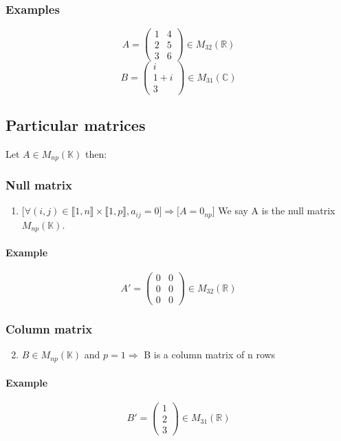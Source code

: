 \documentclass[notitlepage]{math}
\begin{document}
\subsubsection{Examples}

\[ A = \begin{pmatrix}
    1 & 4  \\
    2 & 5 \\
    3 & 6 
\end{pmatrix}\in M_{32}(\mathbb{R})\]
\[
B = \begin{pmatrix}
    i \\
    1 + i \\
    3
\end{pmatrix}\in M_{31}(\mathbb{C})\]

\subsection{Particular matrices}
Let $A \in M_{np}(\mathbb{K})$ then:
\subsubsection{Null matrix}
\begin{enumerate}
    \item  $\lbrack \forall (i,j) \in \llbracket 1,n \rrbracket \times \llbracket 1,p \rrbracket, a_{ij} = 0 \rbrack \Rightarrow \lbrack A = 0_{np} \rbrack$
    We say A is the null matrix $M_{np}(\mathbb{K})$.
\end{enumerate}
\paragraph{Example}
\[ A'=
\begin{pmatrix}
    0 & 0  \\
    0 & 0  \\
    0 & 0 
\end{pmatrix}\in M_{32}(\mathbb{R})\]

\subsubsection{Column matrix}
\begin{enumerate}
    \setcounter{enumi}{1}
    \item $B \in M_{np}(\mathbb{K})$ and $ p = 1 \Rightarrow $ B is a column matrix of n rows
\end{enumerate}
\paragraph{Example}
\[ B' = \begin{pmatrix}
    1 \\
    2 \\
    3
\end{pmatrix} \in M_{31}(\mathbb{R})\]
\end{document}
